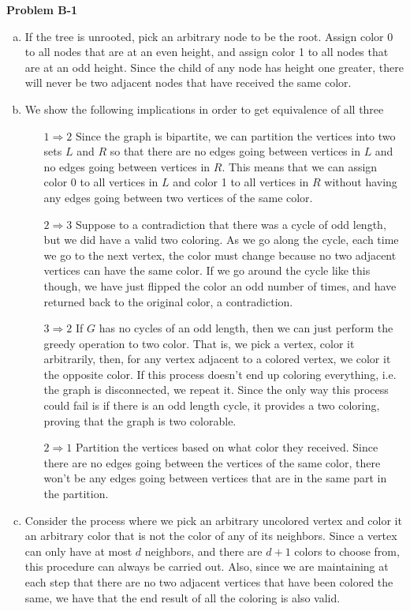 \documentclass{article}
\begin{document}
\noindent\textbf{Problem B-1}\\
\begin{enumerate}[a.]
\item If the tree is unrooted, pick an arbitrary node to be the root. Assign color 0 to all nodes that are at an even height, and assign color 1 to all nodes that are at an odd height. Since the child of any node has height one greater, there will never be two adjacent nodes that have received the same color.
\item We show the following implications in order to get equivalence of all three
\begin{enumerate}
\item[$1\Rightarrow 2$] Since the graph is bipartite, we can partition the vertices into two sets $L$ and $R$ so that there are no edges going between vertices in $L$ and no edges going between vertices in $R$. This means that we can assign color 0 to all vertices in $L$ and color 1 to all vertices in $R$ without having any edges going between two vertices of the same color.
\item[$2\Rightarrow 3$]
Suppose to a contradiction that there was a cycle of odd length, but we did have a valid two coloring. As we go along the cycle, each time we go to the next vertex, the color must change because no two adjacent vertices can have the same color. If we go around the cycle like this though, we have just flipped the color an odd number of times, and have returned back to the original color, a contradiction.
\item[$3\Rightarrow 2$]
If $G$ has no cycles of an odd length, then we can just perform the greedy operation to two color. That is, we pick a vertex, color it arbitrarily, then, for any vertex adjacent to a colored vertex, we color it the opposite color. If this process doesn't end up coloring everything, i.e. the graph is disconnected, we repeat it. Since the only way this process could fail is if there is an odd length cycle, it provides a two coloring, proving that the graph is two colorable.
\item[$2\Rightarrow 1$]
Partition the vertices based on what color they received. Since there are no edges going between the vertices of the same color, there won't be any edges going between vertices that are in the same part in the partition.
\end{enumerate}
\item
Consider the process where we pick an arbitrary uncolored vertex and color it an arbitrary color that is not the color of any of its neighbors. Since a vertex can only have at most $d$ neighbors, and there are $d+1$ colors to choose from, this procedure can always be carried out. Also, since we are maintaining at each step that there are no two adjacent vertices that have been colored the same, we have that the end result of all the coloring is also valid.

\end{enumerate}
\end{document}
